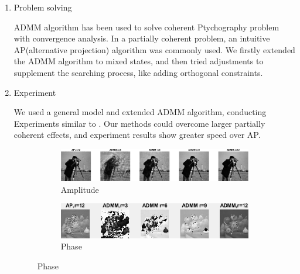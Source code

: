 \documentclass{article}
\numberwithin{equation}{section}
\begin{document}
\begin{enumerate}[leftmargin=*]
 
  

\item Problem solving

 ADMM algorithm has been used to solve coherent Ptychography problem with convergence analysis\cite{admm}. In a partially coherent problem, an intuitive AP(alternative projection) algorithm was commonly used. We firstly extended the ADMM algorithm to mixed states, and then tried adjustments to supplement the searching process, like adding orthogonal constraints.
 
\item Experiment

 We used a general model and extended ADMM algorithm, conducting Experiments similar to \cite{chang}. Our methods could overcome larger partially coherent effects, and experiment results show greater speed over AP.
 
 \begin{figure}[H]
 \centering
 \caption{}
 \begin{subfigure}{1\textwidth}
     \centering
     \includegraphics[width=0.9\linewidth]{../figures/modes_u.eps}  
    \caption{Amplitude}
     \label{fig:modes_u}
  \end{subfigure}
  \begin{subfigure}{1\textwidth}
     \centering
     \includegraphics[width=.9\linewidth]{../figures/modes_u_phaze.png}  
     \caption{Phase}
     \label{fig:modes_u_phaze}
  \end{subfigure}
  
     \label{fig:modes_images}
 
  \end{figure}
  

\end{enumerate}
\end{document}
